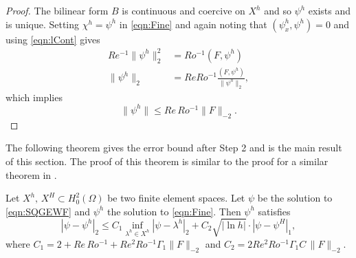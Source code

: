 \begin{proof}
  The bilinear form $B$ is continuous and coercive on $X^h$ and so $\psi^h$
  exists and is unique. Setting $\chi^h=\psi^h$ in \eqref{eqn:Fine} and again
  noting that $(\psi_x^h,\psi^h)=0$ and using \eqref{eqn:lCont} gives
  \begin{align*}
    Re^{-1} \|\psi^h\|_2^2 &= Ro^{-1} (F,\psi^h) \\
    \|\psi^h\|_2 &= Re Ro^{-1} \frac{(F,\psi^h)}{\|\psi^h\|_2},
  \end{align*}
  which implies
  \begin{equation*}
    \|\psi^h\| \le Re\, Ro^{-1} \|F\|_{-2}.
  \end{equation*}
\end{proof}

The following theorem gives the error bound after Step 2 and is the main result
of this section. The proof of this theorem is similar to the proof for a similar
theorem in \cite{Fairag98}.
\begin{thm} \label{thm:2LTwoLevel}
  Let $X^h,\, X^H\subset H^2_0(\Omega)$ be two finite element spaces. Let $\psi$ be
  the solution to \eqref{eqn:SQGEWF} and $\psi^h$ the solution to
  \eqref{eqn:Fine}. Then $\psi^h$ satisfies
  \begin{equation}
    |\psi-\psi^h|_2 \le C_1 \inf_{\lambda^h\in X^h} |\psi-\lambda^h|_2 + C_2
      \sqrt{|\ln h|}\cdot |\psi - \psi^H|_1,
    \label{eqn:Error}
  \end{equation}
  where $C_1 = 2 + Re\,Ro^{-1} + Re^2 Ro^{-1} \Gamma_1 \|F\|_{-2}$ and $C_2= 2
  Re^2 Ro^{-1} \Gamma_1 C\,\|F\|_{-2}$.
\end{thm}
